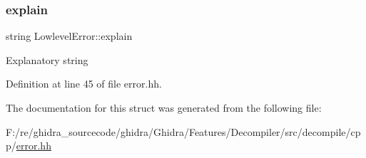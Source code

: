 \subsubsection{\texorpdfstring{explain}{explain}}
{\footnotesize\ttfamily string Lowlevel\+Error\+::explain}

Explanatory string 

Definition at line 45 of file error.\+hh.



The documentation for this struct was generated from the following file\+:\begin{DoxyCompactItemize}
\item 
F\+:/re/ghidra\+\_\+sourcecode/ghidra/\+Ghidra/\+Features/\+Decompiler/src/decompile/cpp/\mbox{\hyperlink{error_8hh}{error.\+hh}}\end{DoxyCompactItemize}
